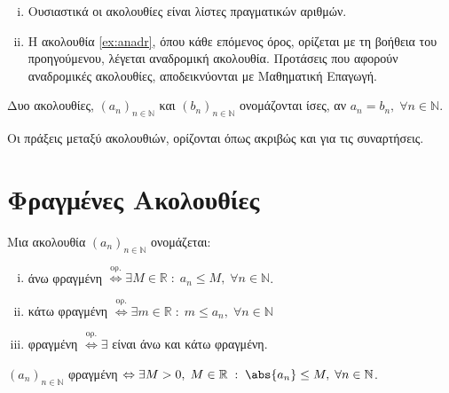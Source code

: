 \documentclass[main.tex]{subfiles}
\begin{document}
\begin{rem}
\item {}
    \begin{enumerate}[i)]
        \item Ουσιαστικά οι ακολουθίες είναι λίστες πραγματικών αριθμών.
        \item Η ακολουθία \ref{ex:anadr}, όπου κάθε επόμενος όρος, ορίζεται με τη 
            βοήθεια του προηγούμενου, λέγεται αναδρομική ακολουθία. Προτάσεις που 
            αφορούν αναδρομικές ακολουθίες, αποδεικνύονται με Μαθηματική Επαγωγή.
    \end{enumerate}
\end{rem}


\begin{dfn}
    Δυο ακολουθίες, $(a_{n})_{n \in \mathbb{N}}$  και $ (b_{n})_{n \in \mathbb{N}} $
    ονομάζονται ίσες, αν $ a_{n} = b_{n}, \; \forall n \in \mathbb{N} $.
\end{dfn}

\begin{dfn}
    Οι πράξεις μεταξύ ακολουθιών, ορίζονται όπως ακριβώς και για τις συναρτήσεις.
\end{dfn}

\section{Φραγμένες Ακολουθίες}

\begin{dfn}
\item {}
    Μια ακολουθία $ (a_{n})_{n \in \mathbb{N}} $ ονομάζεται:
    \begin{enumerate}[i)]
        \item άνω φραγμένη $ \overset{\text{ορ.}}{\Leftrightarrow} \exists M \in 
            \mathbb{R} \; : \; a_{n} \leq M, \; \forall n \in \mathbb{N}$.
        \item κάτω φραγμένη $ \overset{\text{ορ.}}{\Leftrightarrow} \exists m \in 
            \mathbb{R} \; : \; m \leq a_{n}, \; \forall n \in \mathbb{N}  $
        \item φραγμένη $ \overset{\text{ορ.}}{\Leftrightarrow} \exists$ είναι άνω και 
            κάτω φραγμένη.
    \end{enumerate}

    \begin{prop}
        $ (a_{n})_{n \in \mathbb{N}} $ φραγμένη $ \Leftrightarrow \exists M>0, \; M \in 
        \mathbb{R} \; : \; \abs{a_{n}} \leq M, \; \forall n \in \mathbb{N} $.
    \end{prop}
\end{dfn}
\end{document}
